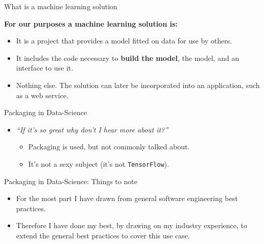 \documentclass[10pt]{beamer}
\begin{document}
\begin{frame}[fragile]{What is a machine learning solution}

  \textbf{For our purposes a machine learning solution is:}

  \begin{itemize}
    \item It is a project that provides a model fitted on data for use by others.
    \item It includes the code necessary to \textbf{build the model}, the model, and an interface to use it.
    \item Nothing else. The solution can later be incorporated into an application, such as a web service.
  \end{itemize}

\end{frame}

\begin{frame}[fragile]{Packaging in Data-Science}

  \begin{itemize}
    \item \textit{``If it's so great why don't I hear more about it?''}
      \begin{itemize}
        \item Packaging is used, but not commonly talked about.
        \item It's not a sexy subject (it's not \texttt{TensorFlow}).
      \end{itemize}
  \end{itemize}
  
\end{frame}


\begin{frame}[fragile]{Packaging in Data-Science: Things to note}

  \begin{itemize}
    \item For the most part I have drawn from general software engineering best practices.
    \item Therefore I have done my best, by drawing on my industry experience, to extend the general best practices to cover this use case.
  \end{itemize}
  
\end{frame}
\end{document}
